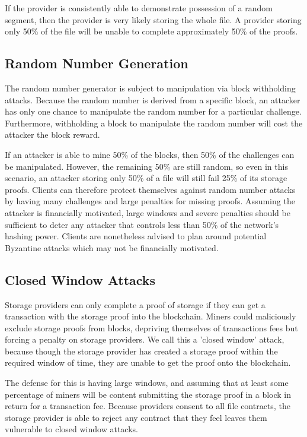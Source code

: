 \documentclass[twocolumn]{article}
\begin{document}

If the provider is consistently able to demonstrate possession of a random segment, then the provider is very likely storing the whole file.
A provider storing only 50\% of the file will be unable to complete approximately 50\% of the proofs.

\subsection{Random Number Generation}
The random number generator is subject to manipulation via block withholding attacks.
Because the random number is derived from a specific block, an attacker has only one chance to manipulate the random number for a particular challenge.
Furthermore, withholding a block to manipulate the random number will cost the attacker the block reward.

If an attacker is able to mine 50\% of the blocks, then 50\% of the challenges can be manipulated.
However, the remaining 50\% are still random, so even in this scenario, an attacker storing only 50\% of a file will still fail 25\% of its storage proofs.
Clients can therefore protect themselves against random number attacks by having many challenges and large penalties for missing proofs.
Assuming the attacker is financially motivated, large windows and severe penalties should be sufficient to deter any attacker that controls less than 50\% of the network's hashing power.
Clients are nonetheless advised to plan around potential Byzantine attacks which may not be financially motivated.

\subsection{Closed Window Attacks}
Storage providers can only complete a proof of storage if they can get a transaction with the storage proof into the blockchain.
Miners could maliciously exclude storage proofs from blocks, depriving themselves of transactions fees but forcing a penalty on storage providers.
We call this a 'closed window' attack, because though the storage provider has created a storage proof within the required window of time, they are unable to get the proof onto the blockchain.

The defense for this is having large windows, and assuming that at least some percentage of miners will be content submitting the storage proof in a block in return for a transaction fee.
Because providers consent to all file contracts, the storage provider is able to reject any contract that they feel leaves them vulnerable to closed window attacks.
\end{document}
